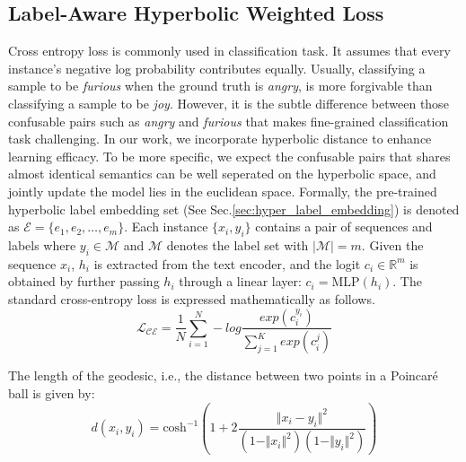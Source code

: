 \subsection{Label-Aware Hyperbolic Weighted Loss}
\label{sec:hyperbolic_weighted_loss}
Cross entropy loss is commonly used in classification task. It assumes that every instance's negative log probability contributes equally. Usually, classifying a sample to be \textit{furious} when the ground truth is \textit{angry}, is more forgivable than classifying a sample to be \textit{joy}. However, it is the subtle difference between those confusable pairs such as \textit{angry} and \textit{furious} that makes fine-grained classification task challenging. 
In our work, we incorporate hyperbolic distance to enhance learning efficacy. To be more specific, we expect the confusable pairs that shares almost identical semantics can be well seperated on the hyperbolic space, and jointly update the model lies in the euclidean space. Formally, the pre-trained hyperbolic label embedding set (See Sec.\ref{sec:hyper_label_embedding}) is denoted as $ \mathcal{E} = \{ e_1, e_2, \dots, e_m \}$. Each instance $\{x_i, y_i\}$ contains a pair of sequences and labels where $y_i \in \mathcal{M}$ and $\mathcal{M}$ denotes the label set with $|\mathcal{M}| = m$. Given the sequence $x_i$, $h_i$ is extracted from the text encoder, and the logit $c_i \in \mathbb{R}^m$ is obtained by further passing $h_i$ through a linear layer: $c_i = \textrm{MLP}(h_i)$.
The standard cross-entropy loss is expressed mathematically as follows. 
\begin{equation}
\mathcal{L}_\mathcal{CE} = \frac{1}{N} \sum_{i = 1}^N-log\frac{exp(c_i^{y_i})}{\sum_{j = 1}^K exp(c_i^j)}
\end{equation}

The length of the geodesic, i.e., the distance between two points in a Poincar\'{e} ball is given by:
\begin{equation}
\label{eq:poincare_distance}
d(x_i, y_i) = \textrm{cosh}^{-1}(1 + 2 \frac{\Vert x_i -y_i \Vert^2}{(1 - \Vert x_i \Vert^2)(1 - \Vert y_i \Vert^2)})
\end{equation}


